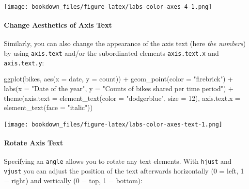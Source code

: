 \documentclass[
]{krantz}
\makeatletter
\newenvironment{Shaded}{\begin{snugshade}}{\end{snugshade}}
\newcommand{\AttributeTok}[1]{\textcolor[rgb]{0.61,0.61,0.61}{#1}}
\newcommand{\DecValTok}[1]{\textcolor[rgb]{0.06,0.06,0.06}{#1}}
\newcommand{\FunctionTok}[1]{\textcolor[rgb]{0,0,0}{#1}}
\newcommand{\NormalTok}[1]{#1}
\newcommand{\SpecialCharTok}[1]{\textcolor[rgb]{0,0,0}{#1}}
\newcommand{\StringTok}[1]{\textcolor[rgb]{0.5,0.5,0.5}{#1}}
\newenvironment{kframe}{%
\medskip{}
\setlength{\fboxsep}{.8em}
 \def\at@end@of@kframe{}%
 \ifinner\ifhmode%
  \def\at@end@of@kframe{\end{minipage}}%
  \begin{minipage}{\columnwidth}%
 \fi\fi%
 \def\FrameCommand##1{\hskip\@totalleftmargin \hskip-\fboxsep
 \colorbox{shadecolor}{##1}\hskip-\fboxsep
     \hskip-\linewidth \hskip-\@totalleftmargin \hskip\columnwidth}%
 \MakeFramed {\advance\hsize-\width
   \@totalleftmargin\z@ \linewidth\hsize
   \@setminipage}}%
 {\par\unskip\endMakeFramed%
 \at@end@of@kframe}
\renewenvironment{Shaded}{\begin{kframe}}{\end{kframe}}
\makeatother
\begin{document}
\texttt{[image: bookdown\_files/figure-latex/labs-color-axes-4-1.png]}

\hypertarget{change-aesthetics-of-axis-text}{%
\paragraph{Change Aesthetics of Axis Text}\label{change-aesthetics-of-axis-text}}

Similarly, you can also change the appearance of the axis text (here \emph{the numbers}) by using \texttt{axis.text} and/or the subordinated elements \texttt{axis.text.x} and \texttt{axis.text.y}:

\begin{Shaded}
\begin{Highlighting}[]
\FunctionTok{ggplot}\NormalTok{(bikes, }\FunctionTok{aes}\NormalTok{(}\AttributeTok{x =}\NormalTok{ date, }\AttributeTok{y =}\NormalTok{ count)) }\SpecialCharTok{+}
  \FunctionTok{geom\_point}\NormalTok{(}\AttributeTok{color =} \StringTok{"firebrick"}\NormalTok{) }\SpecialCharTok{+}
  \FunctionTok{labs}\NormalTok{(}\AttributeTok{x =} \StringTok{"Date of the year"}\NormalTok{, }
       \AttributeTok{y =} \StringTok{"Counts of bikes shared per time period"}\NormalTok{) }\SpecialCharTok{+}
  \FunctionTok{theme}\NormalTok{(}\AttributeTok{axis.text =} \FunctionTok{element\_text}\NormalTok{(}\AttributeTok{color =} \StringTok{"dodgerblue"}\NormalTok{, }\AttributeTok{size =} \DecValTok{12}\NormalTok{),}
        \AttributeTok{axis.text.x =} \FunctionTok{element\_text}\NormalTok{(}\AttributeTok{face =} \StringTok{"italic"}\NormalTok{))}
\end{Highlighting}
\end{Shaded}

\texttt{[image: bookdown\_files/figure-latex/labs-color-axes-text-1.png]}

\hypertarget{rotate-axis-text}{%
\paragraph{Rotate Axis Text}\label{rotate-axis-text}}

Specifying an \texttt{angle} allows you to rotate any text elements. With \texttt{hjust} and \texttt{vjust} you can adjust the position of the text afterwards horizontally (0 = left, 1 = right) and vertically (0 = top, 1 = bottom):
\end{document}
